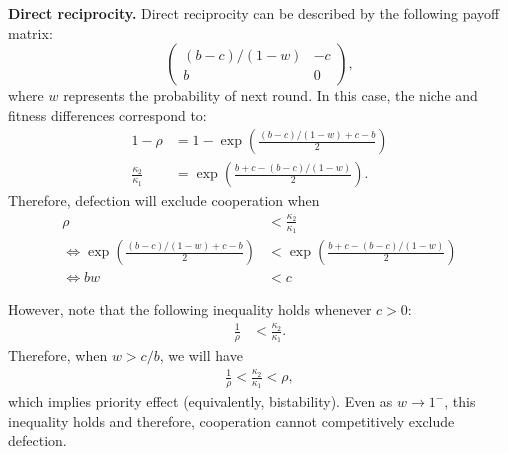 \documentclass[12pt]{article}
\begin{document}
\textbf{Direct reciprocity.}
Direct reciprocity can be described by the following payoff matrix:
\begin{equation}
\begin{pmatrix}
(b-c)/(1-w) & -c \\
b & 0
\end{pmatrix},
\end{equation}
where $w$ represents the probability of next round. 
In this case, the niche and fitness differences correspond to:
\begin{align}
1-\rho &= 1- \exp\left(\frac{(b-c)/(1-w) + c - b}{2}\right) \\
\frac{\kappa_2}{\kappa_1} &= \exp\left(\frac{b+c-(b-c)/(1-w)}{2}\right).
\end{align}
Therefore, defection will exclude cooperation when 
\begin{align}
\rho &< \frac{\kappa_2}{\kappa_1}\\
\iff \exp\left(\frac{(b-c)/(1-w) + c - b}{2}\right) &< \exp\left(\frac{b+c-(b-c)/(1-w)}{2}\right)\\
\iff bw &< c
\end{align}

However, note that the following inequality holds whenever $c > 0$:
\begin{align}
\frac{1}{\rho} &< \frac{\kappa_2}{\kappa_1}.
\end{align}
Therefore, when $w > c/b$, we will have
\begin{align}
\frac{1}{\rho} < \frac{\kappa_2}{\kappa_1} < \rho,
\end{align}
which implies priority effect (equivalently, bistability).
Even as $w \to 1^-$, this inequality holds and therefore, cooperation cannot competitively exclude defection.
\end{document}
